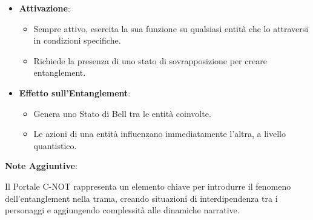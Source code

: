 \begin{tcolorbox}[fontupper=\footnotesize, fontlower=\Large,colback=white,colframe=black,title=\textbf{Portale C-NOT}]
\begin{multicols}{2}
\begin{itemize}
    \item \textbf{Attivazione}:
    \begin{itemize}
        \item Sempre attivo, esercita la sua funzione su qualsiasi entità che lo attraversi in condizioni specifiche.
        \item Richiede la presenza di uno stato di sovrapposizione per creare entanglement.
    \end{itemize}
    \item \textbf{Effetto sull'Entanglement}:
    \begin{itemize}
        \item Genera uno Stato di Bell tra le entità coinvolte.
        \item Le azioni di una entità influenzano immediatamente l'altra, a livello quantistico.
    \end{itemize}
\end{itemize}

\textbf{Note Aggiuntive}:

Il Portale C-NOT rappresenta un elemento chiave per introdurre il fenomeno dell'entanglement nella trama, creando situazioni di interdipendenza tra i personaggi e aggiungendo complessità alle dinamiche narrative.

\end{multicols}
\end{tcolorbox}

\vspace{0.5cm}

